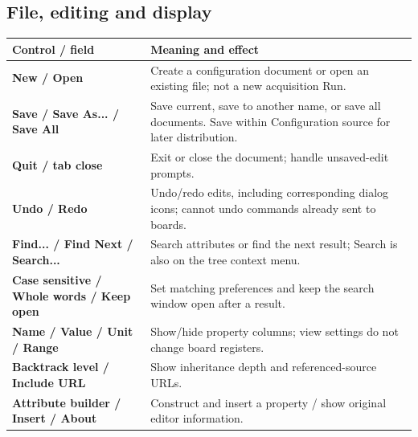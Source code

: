 \documentclass[11pt,a4paper]{article}
\newcommand{\ui}[1]{\textbf{#1}}
\begin{document}
\subsection*{File, editing and display}
\begin{tabularx}{\linewidth}{@{}L{58mm}Y@{}}\toprule
Control / field & Meaning and effect \\\midrule
\ui{New / Open} & Create a configuration document or open an existing file; not a new acquisition Run.\\
\ui{Save / Save As... / Save All} & Save current, save to another name, or save all documents. Save within Configuration source for later distribution.\\
\ui{Quit / tab close} & Exit or close the document; handle unsaved-edit prompts.\\
\ui{Undo / Redo} & Undo/redo edits, including corresponding dialog icons; cannot undo commands already sent to boards.\\
\ui{Find... / Find Next / Search...} & Search attributes or find the next result; Search is also on the tree context menu.\\
\ui{Case sensitive / Whole words / Keep open} & Set matching preferences and keep the search window open after a result.\\
\ui{Name / Value / Unit / Range} & Show/hide property columns; view settings do not change board registers.\\
\ui{Backtrack level / Include URL} & Show inheritance depth and referenced-source URLs.\\
\ui{Attribute builder / Insert / About} & Construct and insert a property / show original editor information.\\
\bottomrule\end{tabularx}
\end{document}
